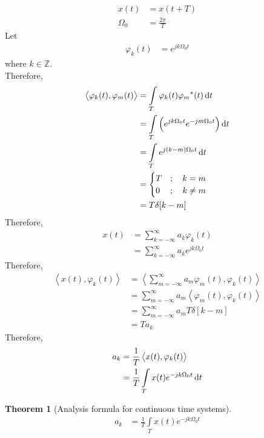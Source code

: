 \documentclass[titlepage, fleqn, a4paper, 12pt, twoside]{article}
\theoremstyle{definition}
\theoremstyle{theorem}
\newtheorem{theorem}{Theorem}
\begin{document}
\begin{align*}
	x(t) &= x(t + T)\\
	\Omega_0 &= \frac{2 \pi}{T}
\end{align*}
Let
\begin{align*}
	\varphi_k(t) &= e^{j k \Omega_0 t}
\end{align*}
where $k \in \mathbb{Z}$.\\
Therefore,
\begin{align*}
	\left\langle \varphi_k(t),\varphi_m(t) \right\rangle &= \int\limits_{T} \varphi_k(t) {\varphi_m}^*(t) \dif t\\
	&= \int\limits_{T} \left( e^{j k \Omega_0 t} e^{-j m \Omega_0 t} \right) \dif t\\
	&= \int\limits_{T} e^{j (k - m) \Omega_0 t} \dif t\\
	&=
		\begin{cases}
			T &;\quad k = m\\
			0 &;\quad k \neq m\\
		\end{cases}\\
	&= T \delta[k - m]
\end{align*}
Therefore,
\begin{align*}
	x(t) &= \sum\limits_{k = -\infty}^{\infty} a_k \varphi_k(t)\\
	&= \sum\limits_{k = -\infty}^{\infty} a_k e^{j k \Omega_0 t}
\end{align*}
Therefore,
\begin{align*}
	\left\langle x(t),\varphi_k(t) \right\rangle &= \left\langle \sum\limits_{m = -\infty}^{\infty} a_m \varphi_m(t) , \varphi_k(t) \right\rangle\\
	&= \sum\limits_{m = -\infty}^{\infty} a_m \left\langle \varphi_m(t),\varphi_k(t) \right\rangle\\
	&= \sum\limits_{m = -\infty}^{\infty} a_m T \delta[k - m]\\
	&= T a_k
\end{align*}
Therefore,
\begin{align*}
	a_k &= \frac{1}{T} \left\langle x(t),\varphi_k(t) \right\rangle\\
	&= \frac{1}{T} \int\limits_{T} x(t) e^{-j k \Omega_0 t} \dif t\\
\end{align*}

\begin{theorem}[Analysis formula for continuous time systems]
	\begin{align*}
		a_k &= \frac{1}{T} \int\limits_{T} x(t) e^{-j k \Omega_0 t}
	\end{align*}
	\label{thm:Analysis_formula_for_continuous_time_systems}
\end{theorem}
\end{document}
